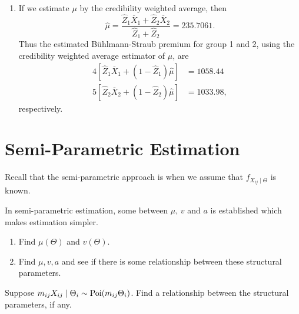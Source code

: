 \documentclass[notoc,notitlepage]{tufte-book}
\begin{document}
\begin{solution}
\begin{enumerate}
    \item If we estimate $\mu$ by the credibility weighted average, then
      \begin{equation*}
        \hat{\mu} = \frac{\hat{Z}_1 \overline{X}_1 + \hat{Z}_2
        \overline{X}_2}{\hat{Z}_1 + \hat{Z}_2} = 235.7061.
      \end{equation*}
      Thus the estimated Bühlmann-Straub premium for group 1 and 2,
      using the credibility weighted average estimator of $\mu$,
      are
      \begin{align*}
        4 [ \hat{Z}_1 \overline{X}_1 + (1 - \hat{Z}_1) \hat{\mu} ] &= 1058.44 \\
        5 [ \hat{Z}_2 \overline{X}_2 + (1 - \hat{Z}_2) \hat{\mu} ] &= 1033.98,
      \end{align*}
      respectively.
  \end{enumerate}
\end{solution}


\section{Semi-Parametric Estimation}%
\label{sec:semi_parametric_estimation}


Recall that the semi-parametric approach is when we assume that $f_{X_{ij} \mid
\Theta}$ is known.

In semi-parametric estimation,
some  between $\mu,\, v$ and $a$ is established
which makes estimation simpler.

\begin{procedure}\label{procedure:relationship_between_structural_parameters_in_semi_parameteric_estimation}
  \begin{enumerate}
    \item Find $\mu(\Theta)$ and $v(\Theta)$.
    \item Find $\mu, v, a$ and see if there is
      some relationship between these structural parameters.
  \end{enumerate}
\end{procedure}

\begin{eg}
  Suppose $m_{ij} X_{ij} \mid \Theta_i \sim \operatorname{Poi}(m_{ij} \Theta_i)$.
  Find a relationship between the structural parameters, if any.
\end{eg}
\end{document}
